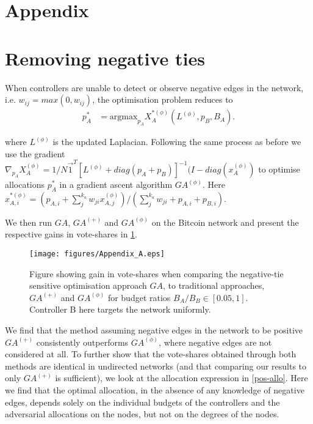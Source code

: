 \section*{Appendix}
\appendix
{}

\section{Removing negative ties}
\label{appendix-rem}
When controllers are unable to detect or observe negative edges in the network, i.e. $w_{ij}=max(0,w_{ij})$, the optimisation problem reduces to
\begin{align}
    p_{A}^* &= \text{argmax}_{p_{A}} X_{A}^{*(\phi)}(L^{(\phi)},p_{B},B_{A}).
\end{align}

where $L^{(\phi)}$ is the updated Laplacian. 
Following the same process as before we use the gradient $\nabla_{p_{A}} X_{A}^{(\phi)} = 1/N \Vec{1}^{T} [L^{(\phi)}+diag(p_{A}+p_{B})]^{-1}(I - diag(x_{A}^{(\phi)})$ to optimise allocations $p_{A}^*$ in a gradient ascent algorithm $GA^{(\phi)}$. Here $    x_{A,i}^{*(\phi)} = (p_{A,i} + \sum\limits_{j}^{k_a}w_{ji} x_{A,j}^{(\phi)}) / (\sum\limits_{j}^{k_a}w_{ji} + p_{A,i} + p_{B,i})$.


We then run $GA$, $GA^{(+)}$ and $GA^{(\phi)}$ on the Bitcoin network and present the respective gains in vote-shares in \cref{rem}.


  \begin{figure}
  \centering
    \texttt{[image: figures/Appendix\_A.eps]}
    \caption{Figure showing gain in vote-shares when comparing the negative-tie sensitive optimisation approach $GA$, to traditional approaches, $GA^{(+)}$ and $GA^{(\phi)}$ for budget ratios $B_{A}/B_{B} \in [0.05,1]$. Controller B here targets the network uniformly.}
    \label{rem}
  \end{figure}

We find that the method assuming negative edges in the network to be positive $GA^{(+)}$ consistently outperforms $GA^{(\phi)}$, where negative edges are not considered at all. 
To further show that the vote-shares obtained through both methods are identical in undirected networks (and that comparing our results to only $GA^{(+)}$ is sufficient), we look at the allocation expression in \cref{pos-allo}. Here we find that the optimal allocation, in the absence of any knowledge of negative edges, depends solely on the individual budgets of the controllers and the adversarial allocations on the nodes, but not on the degrees of the nodes.   

